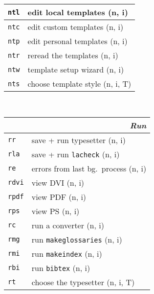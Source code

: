 \documentclass[oneside,10pt,landscape,DIV16]{scrartcl}
\newcommand{\Map}[1] {\textbf{\textasciiacute}\texttt{#1}}
\begin{document}
\begin{multicols}{3}
\begin{center}
\begin{tabular}[]{|p{11mm}|p{60mm}|}
\hline
\hline \Map{ntl} & edit local templates      \hfill (n, i)   \\
\hline \Map{ntc} & edit custom templates     \hfill (n, i)   \\
\hline \Map{ntp} & edit personal templates   \hfill (n, i)   \\
\hline \Map{ntr} & reread the templates      \hfill (n, i)   \\
\hline \Map{ntw} & template setup wizard     \hfill (n, i)   \\
\hline \Map{nts} & choose template style     \hfill (n, i, T)\\
\hline
%
\end{tabular}\\
%
\begin{tabular}[]{|p{11mm}|p{62mm}|}
\hline
\multicolumn{2}{|r|}{\textsl{\textbf{R}un}} \\[1.0ex]
\hline \Map{rr}   & save + run typesetter                    \hfill (n, i)\\
\hline \Map{rla}  & save + run \texttt{lacheck}              \hfill (n, i)\\
\hline \Map{re}   & errors from last bg.\ process            \hfill (n, i)\\
\hline \Map{rdvi} & view DVI                                 \hfill (n, i)\\
\hline \Map{rpdf} & view PDF                                 \hfill (n, i)\\
\hline \Map{rps}  & view PS                                  \hfill (n, i)\\
\hline \Map{rc}   & run a converter                          \hfill (n, i)\\
\hline
\hline \Map{rmg}  & run \texttt{makeglossaries}              \hfill (n, i)\\
\hline \Map{rmi}  & run \texttt{makeindex}                   \hfill (n, i)\\
\hline \Map{rbi}  & run \texttt{bibtex}                      \hfill (n, i)\\
\hline
\hline \Map{rt}   & choose the typesetter                    \hfill (n, i, T)\\

\end{tabular}
\end{center}
\end{multicols}
\end{document}
